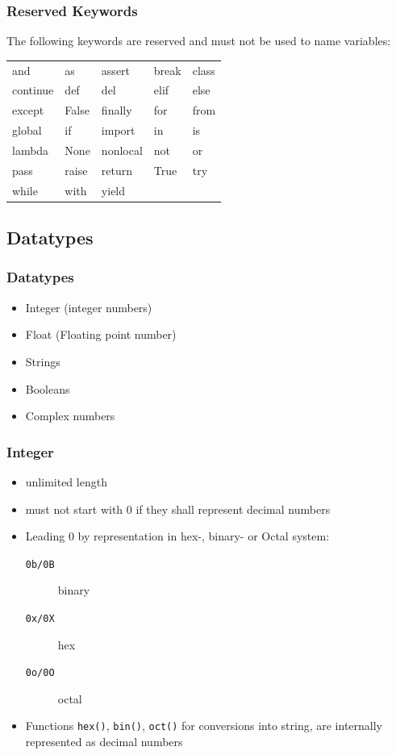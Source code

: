 \documentclass[ngerman]{beamer}
\begin{document}
\begin{frame}
\frametitle{Reserved Keywords}

The following  keywords are reserved and must not be used to name variables:

\begin{center}
\begin{tabular}{p{}p{}p{}p{}p{}}
and	&	as	&	assert	&	break	&	class	\\
continue	&	def	&	del	&	elif	&	else	\\
except	&	False	&	finally	&	for	&	from	\\
global	&	if	&	import	&	in	&	is	\\
lambda	&	None	&	nonlocal	&	not	&	or	\\
pass	&	raise	&	return	&	True	&	try	\\
while	&	with	&	yield	&		&		\\
\end{tabular}
\end{center}
\end{frame}



\subsection{Datatypes}

\begin{frame}
\frametitle{Datatypes}


\begin{itemize}
\item Integer (integer numbers)
\item Float (Floating point number)
\item Strings
\item Booleans
\item Complex numbers
\end{itemize}
\end{frame}

\begin{frame}
\frametitle{Integer}

\begin{itemize}
\item unlimited length
\item must not start with 0 if they shall represent decimal numbers 
\item Leading 0 by representation in hex-, binary- or Octal system:
\begin{description}
\item[\texttt{0b/0B}] binary
\item[\texttt{0x/0X}] hex
\item[\texttt{0o/0O}] octal
\end{description}
\item Functions \texttt{hex()}, \texttt{bin()}, \texttt{oct()} for conversions into string, are internally represented as decimal numbers 
\end{itemize}
\end{frame}
\end{document}
